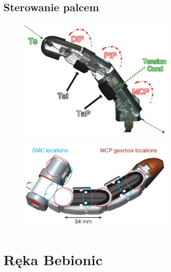 \documentclass[8pt]{beamer}
\begin{document}
	\subsection{Sterowanie palcem}
		\begin{frame}
			\begin{center}
				\begin{figure}
					\includegraphics[width=0.7\textwidth]{graphics/smarthand_finger.jpg}
					\label{graph:build}	
					\caption{ \cite{6361492}}
				\end{figure}
			\end{center}
		\end{frame}				

		\begin{frame}
			\begin{center}
				\begin{figure}
					\includegraphics[width=0.7\textwidth]{graphics/finger_motors_mpl.png}
					\label{graph:build}	
					\caption{ \cite{6361492}}
				\end{figure}
			\end{center}
		\end{frame}				


\section{Ręka Bebionic}
\end{document}
